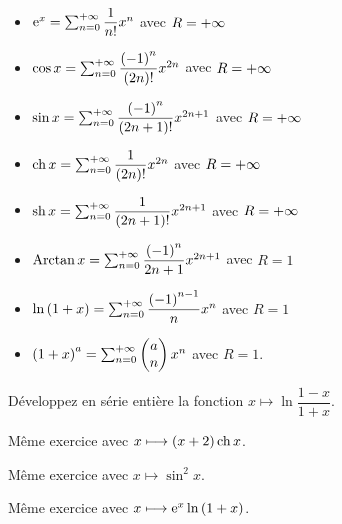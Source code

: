 \begin{itemize}
    \item \(\e{x}=\sum_{n=0}^{\pinf}\dfrac{1}{n!}x^n\) avec \(R=\pinf\) \\
    \item \(\cos x=\sum_{n=0}^{\pinf}\dfrac{\paren{-1}^n}{\paren{2n}!}x^{2n}\) avec \(R=\pinf\) \\
    \item \(\sin x=\sum_{n=0}^{\pinf}\dfrac{\paren{-1}^n}{\paren{2n+1}!}x^{2n+1}\) avec \(R=\pinf\) \\
    \item \(\ch x=\sum_{n=0}^{\pinf}\dfrac{1}{\paren{2n}!}x^{2n}\) avec \(R=\pinf\) \\
    \item \(\sh x=\sum_{n=0}^{\pinf}\dfrac{1}{\paren{2n+1}!}x^{2n+1}\) avec \(R=\pinf\) \\
    \item \(\Arctan x=\sum_{n=0}^{\pinf}\dfrac{\paren{-1}^n}{2n+1}x^{2n+1}\) avec \(R=1\) \\
    \item \(\ln\paren{1+x}=\sum_{n=0}^{\pinf}\dfrac{\paren{-1}^{n-1}}{n}x^n\) avec \(R=1\) \\
    \item \(\paren{1+x}^a=\sum_{n=0}^{\pinf}\binom{n}{a}x^n\) avec \(R=1\).
\end{itemize}

\begin{exo}
Développez en série entière la fonction \(x\mapsto\ln\dfrac{1-x}{1+x}\).
\end{exo}

\begin{exo}
Même exercice avec \(x\mapsto\paren{x+2}\ch x\).
\end{exo}

\begin{exo}
Même exercice avec \(x\mapsto\sin^2x\).
\end{exo}

\begin{exo}
Même exercice avec \(x\mapsto\e{x}\ln\paren{1+x}\).
\end{exo}
